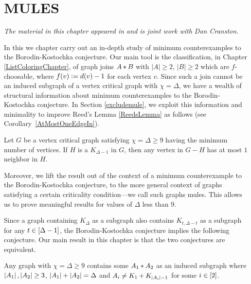 \chapter{MULES}\label{APrioriWowChapter}
\begin{center}
\emph{The material in this chapter appeared in \cite{mules} and is joint work with Dan Cranston.}
\end{center}

In this we chapter carry out an in-depth study of minimum counterexamples to the
Borodin-Kostochka conjecture.  Our main tool is the classification, in Chapter
\ref{ListColoringChapter}, of graph joins $A \mbox{\hspace{2 pt}$\ast$\hspace{2 pt}} B$ with $|A|\ge 2$, $|B|\ge
2$ which are $f$-choosable, where $f(v) \mathrel{\mathop:}= d(v) - 1$ for each vertex
$v$.  Since such a join cannot be an induced subgraph of a vertex critical
graph with $\chi = \Delta$, we have a wealth of structural information about
minimum counterexamples to the Borodin-Kostochka conjecture.  In Section
\ref{excludemule}, we exploit this information and minimality to improve Reed's
Lemma \ref{ReedsLemma} as follows (see Corollary~\ref{AtMostOneEdgeIn}).

\begin{lem}
Let $G$ be a vertex critical graph satisfying $\chi = \Delta \geq 9$ having the
minimum number of vertices. 
If $H$ is a $K_{\Delta - 1}$ in $G$, then any vertex in $G - H$ has at most $1$
neighbor in $H$.
\end{lem}

Moreover, we lift the result out of the context of a minimum counterexample to
the Borodin-Kostochka conjecture, to the more general context of graphs
satisfying a certain criticality condition---we call such graphs mules. This allows us to prove meaningful results for values of $\Delta$ less than
$9$.  

Since a graph containing $K_\Delta$ as a subgraph also
contains $K_{t, \Delta - t}$ as a subgraph for any $t \in \left[\Delta - 1\right]$,
the Borodin-Kostochka conjecture implies the following conjecture.  Our main
result in this chapter is that the two conjectures are equivalent.

\begin{conjecture}\label{NoThreeDealEquiv}
Any graph with $\chi = \Delta \geq 9$ contains some $A_1 \mbox{\hspace{2 pt}$\ast$\hspace{2 pt}} A_2$ as an
induced subgraph where $\left|A_1\right|, \left|A_2\right| \geq 3$, $\left|A_1\right| + \left|A_2\right| = \Delta$
and $A_i \neq K_1 \mbox{\hspace{2 pt}$+$\hspace{2 pt}} K_{\left|A_i\right| - 1}$ for some $i \in \left[2\right]$.
\end{conjecture}

